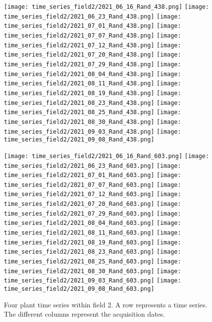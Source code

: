 \documentclass{article}
\begin{document}
\begin{figure}[t]
    \texttt{[image: time\_series\_field2/2021\_06\_16\_Rand\_438.png]}
    \texttt{[image: time\_series\_field2/2021\_06\_23\_Rand\_438.png]}
    \texttt{[image: time\_series\_field2/2021\_07\_01\_Rand\_438.png]}
    \texttt{[image: time\_series\_field2/2021\_07\_07\_Rand\_438.png]}
    \texttt{[image: time\_series\_field2/2021\_07\_12\_Rand\_438.png]}
    \texttt{[image: time\_series\_field2/2021\_07\_20\_Rand\_438.png]}
    \texttt{[image: time\_series\_field2/2021\_07\_29\_Rand\_438.png]}
    \texttt{[image: time\_series\_field2/2021\_08\_04\_Rand\_438.png]}
     \texttt{[image: time\_series\_field2/2021\_08\_11\_Rand\_438.png]}
     \texttt{[image: time\_series\_field2/2021\_08\_19\_Rand\_438.png]}
    \texttt{[image: time\_series\_field2/2021\_08\_23\_Rand\_438.png]}
    \texttt{[image: time\_series\_field2/2021\_08\_25\_Rand\_438.png]}
     \texttt{[image: time\_series\_field2/2021\_08\_30\_Rand\_438.png]}
     \texttt{[image: time\_series\_field2/2021\_09\_03\_Rand\_438.png]}
     \texttt{[image: time\_series\_field2/2021\_09\_08\_Rand\_438.png]}

     \texttt{[image: time\_series\_field2/2021\_06\_16\_Rand\_603.png]}
    \texttt{[image: time\_series\_field2/2021\_06\_23\_Rand\_603.png]}
    \texttt{[image: time\_series\_field2/2021\_07\_01\_Rand\_603.png]}
    \texttt{[image: time\_series\_field2/2021\_07\_07\_Rand\_603.png]}
    \texttt{[image: time\_series\_field2/2021\_07\_12\_Rand\_603.png]}
    \texttt{[image: time\_series\_field2/2021\_07\_20\_Rand\_603.png]}
    \texttt{[image: time\_series\_field2/2021\_07\_29\_Rand\_603.png]}
    \texttt{[image: time\_series\_field2/2021\_08\_04\_Rand\_603.png]}
     \texttt{[image: time\_series\_field2/2021\_08\_11\_Rand\_603.png]}
     \texttt{[image: time\_series\_field2/2021\_08\_19\_Rand\_603.png]}
    \texttt{[image: time\_series\_field2/2021\_08\_23\_Rand\_603.png]}
    \texttt{[image: time\_series\_field2/2021\_08\_25\_Rand\_603.png]}
     \texttt{[image: time\_series\_field2/2021\_08\_30\_Rand\_603.png]}
     \texttt{[image: time\_series\_field2/2021\_09\_03\_Rand\_603.png]}
     \texttt{[image: time\_series\_field2/2021\_09\_08\_Rand\_603.png]}
\caption{Four plant time series within field 2. A row represents a time series. The different columns represent the acquisition dates.} 
	\label{fig:timeSeries_others_field2}
\end{figure}
\end{document}
